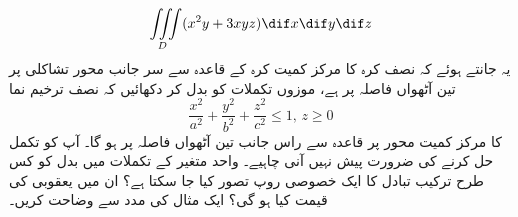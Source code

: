 \[\iiint\limits_D (x^2y+3xyz)\dif x\dif y\dif z\]
یہ جانتے ہوئے کہ  نصف کرہ کا مرکز کمیت کرہ  کے قاعدہ سے   سر  جانب محور تشاکلی  پر   تین آٹھواں فاصلہ پر ہے،  موزوں تکملات کو بدل کر دکھائیں کہ نصف  ترخیم نما 
\[\frac{x^2}{a^2}+\frac{y^2}{b^2}+\frac{z^2}{c^2}\le 1,\, z\ge 0\]
کا مرکز کمیت  محور  پر قاعدہ سے راس جانب تین آٹھواں فاصلہ پر ہو گا۔ آپ کو تکمل حل کرنے کی ضرورت پیش نہیں آنی چاہیے۔
واحد متغیر کے تکملات  میں بدل کو کس طرح ترکیب تبادل کا ایک خصوصی روپ تصور کیا جا سکتا ہے؟ ان میں یعقوبی کی قیمت کیا ہو گی؟ ایک مثال کی مدد سے وضاحت کریں۔

